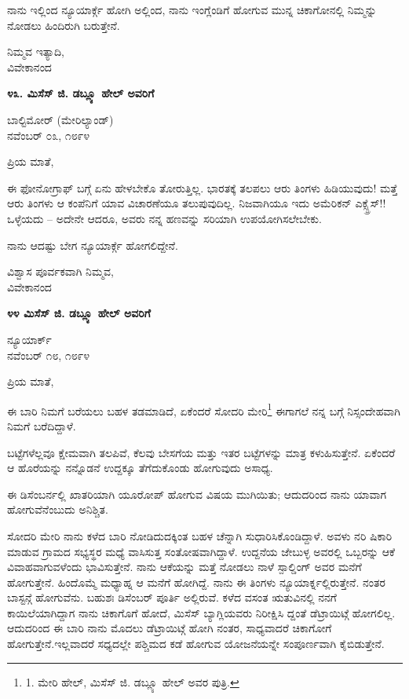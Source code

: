 ನಾನು ಇಲ್ಲಿಂದ ನ್ಯೂಯಾರ್ಕ್ಗೆ ಹೋಗಿ ಅಲ್ಲಿಂದ, ನಾನು ಇಂಗ್ಲೆಂಡಿಗೆ ಹೋಗುವ ಮುನ್ನ ಚಿಕಾಗೋನಲ್ಲಿ ನಿಮ್ಮನ್ನು ನೋಡಲು ಹಿಂದಿರುಗಿ ಬರುತ್ತೇನೆ.

\begin{flushright}
ನಿಮ್ಮವ ಇತ್ಯಾದಿ,\\ವಿವೇಕಾನಂದ
\end{flushright}

\begin{center}
\textbf{೪೩. ಮಿಸೆಸ್ ಜಿ. ಡಬ್ಲ್ಯೂ ಹೇಲ್ ಅವರಿಗೆ}
\end{center}

\begin{flushright}
ಬಾಲ್ಟಿಮೋರ್ (ಮೇರಿಲ್ಯಾಂಡ್)\\ನವೆಂಬರ್ ೦೩, ೧೮೯೪
\end{flushright}

ಪ್ರಿಯ ಮಾತೆ,

ಈ ಫೋನೋಗ್ರಾಫ್ ಬಗ್ಗೆ ಏನು ಹೇಳಬೇಕೊ ತೋರುತ್ತಿಲ್ಲ. ಭಾರತಕ್ಕೆ ತಲಪಲು ಆರು ತಿಂಗಳು ಹಿಡಿಯುವುದು! ಮತ್ತೆ ಆರು ತಿಂಗಳು ಆ ಕಂಪೆನಿಗೆ ಯಾವ ವಿಚಾರಣೆಯೂ ತಲುಪುವುದಿಲ್ಲ. ನಿಜವಾಗಿಯೂ ಇದು ಅಮೆರಿಕನ್ ಎಕ್ಸ್ಪ್ರೆಸ್!! ಒಳ್ಳೆಯದು – ಅದೇನೇ ಆದರೂ, ಅವರು ನನ್ನ ಹಣವನ್ನು ಸರಿಯಾಗಿ ಉಪಯೋಗಿಸಲೇಬೇಕು.

ನಾನು ಆದಷ್ಟು ಬೇಗ ನ್ಯೂಯಾರ್ಕ್ಗೆ ಹೋಗಲಿದ್ದೇನೆ.

\begin{flushright}
ವಿಶ್ವಾಸ ಪೂರ್ವಕವಾಗಿ ನಿಮ್ಮವ,\\ವಿವೇಕಾನಂದ
\end{flushright}

\begin{center}
\textbf{೪೪ ಮಿಸೆಸ್ ಜಿ. ಡಬ್ಲ್ಯೂ ಹೇಲ್ ಅವರಿಗೆ}
\end{center}

\begin{flushright}
ನ್ಯೂಯಾರ್ಕ್\\ನವೆಂಬರ್ ೧೮, ೧೮೯೪
\end{flushright}

ಪ್ರಿಯ ಮಾತೆ,

ಈ ಬಾರಿ ನಿಮಗೆ ಬರೆಯಲು ಬಹಳ ತಡಮಾಡಿದೆ, ಏಕೆಂದರೆ ಸೋದರಿ ಮೇರಿ\footnote{1. ಮೇರಿ ಹೇಲ್, ಮಿಸೆಸ್ ಜಿ. ಡಬ್ಲ್ಯೂ ಹೇಲ್ ಅವರ ಪುತ್ರಿ.} ಈಗಾಗಲೆ ನನ್ನ ಬಗ್ಗೆ ನಿಸ್ಸಂದೇಹವಾಗಿ ನಿಮಗೆ ಬರೆದಿದ್ದಾಳೆ.

ಬಟ್ಟೆಗಳೆಲ್ಲವೂ ಕ್ಷೇಮವಾಗಿ ತಲಪಿವೆ, ಕೆಲವು ಬೇಸಗೆಯ ಮತ್ತು ಇತರ ಬಟ್ಟೆಗಳನ್ನು ಮಾತ್ರ ಕಳುಹಿಸುತ್ತೇನೆ. ಏಕೆಂದರೆ ಆ ಹೊರೆಯನ್ನು ನನ್ನೊಡನೆ ಉದ್ದಕ್ಕೂ ತೆಗೆದುಕೊಂಡು ಹೋಗುವುದು ಅಸಾಧ್ಯ.

ಈ ಡಿಸೆಂಬರ್ನಲ್ಲಿ ಖಾತರಿಯಾಗಿ ಯೂರೋಪ್ ಹೋಗುವ ವಿಷಯ ಮುಗಿಯಿತು; ಆದುದರಿಂದ ನಾನು ಯಾವಾಗ ಹೋಗುವೆನೆಂಬುದು ಅನಿಶ್ಚಿತ.

ಸೋದರಿ ಮೇರಿ ನಾನು ಕಳೆದ ಬಾರಿ ನೋಡಿದುದಕ್ಕಿಂತ ಬಹಳ ಚೆನ್ನಾಗಿ ಸುಧಾರಿಸಿಕೊಂಡಿದ್ದಾಳೆ. ಅವಳು ನರಿ ಷಿಕಾರಿ ಮಾಡುವ ಗ್ರಾಮದ ಸಭ್ಯಸ್ಥರ ಮಧ್ಯೆ ವಾಸಿಸುತ್ತ ಸಂತೋಷವಾಗಿದ್ದಾಳೆ. ಉದ್ದನೆಯ ಜೇಬುಳ್ಳ ಅವರಲ್ಲಿ ಒಬ್ಬರನ್ನು ಆಕೆ ವಿವಾಹವಾಗುವಳೆಂದು ಭಾವಿಸುತ್ತೇನೆ. ನಾನು ಆಕೆಯನ್ನು ಮತ್ತೆ ನೋಡಲು ನಾಳೆ ಸ್ಪಾಲ್ಡಿಂಗ್ ಅವರ ಮನೆಗೆ ಹೋಗುತ್ತೇನೆ. ಹಿಂದೊಮ್ಮೆ ಮಧ್ಯಾಹ್ನ ಆ ಮನೆಗೆ ಹೋಗಿದ್ದೆ. ನಾನು ಈ ತಿಂಗಳು ನ್ಯೂಯಾರ್ಕ್ನಲ್ಲಿರುತ್ತೇನೆ. ನಂತರ ಬಾಸ್ಟನ್ಗೆ ಹೋಗುವೆನು. ಬಹುಶಃ ಡಿಸೆಂಬರ್ ಪೂರ್ತಿ ಅಲ್ಲಿರುವೆ. ಕಳೆದ ವಸಂತ ಋತುವಿನಲ್ಲಿ ನನಗೆ ಕಾಯಿಲೆಯಾಗಿದ್ದಾಗ ನಾನು ಚಿಕಾಗೊಗೆ ಹೋದೆ, ಮಿಸೆಸ್ ಬ್ಯಾಗ್ಲಿಯವರು ನಿರೀಕ್ಷಿಸಿ ದ್ದಂತೆ ಡೆಟ್ರಾಯಿಟ್ಗೆ ಹೋಗಲಿಲ್ಲ. ಆದುದರಿಂದ ಈ ಬಾರಿ ನಾನು ಮೊದಲು ಡೆಟ್ರಾಯಿಟ್ಗೆ ಹೋಗಿ ನಂತರ, ಸಾಧ್ಯವಾದರೆ ಚಿಕಾಗೋಗೆ ಹೋಗುತ್ತೇನೆ.ಇಲ್ಲವಾದರೆ ಸಧ್ಯದಲ್ಲೇ ಪಶ್ಚಿಮದ ಕಡೆ ಹೋಗುವ ಯೋಜನೆಯನ್ನೇ ಸಂಪೂರ್ಣವಾಗಿ ಕೈಬಿಡುತ್ತೇನೆ.

